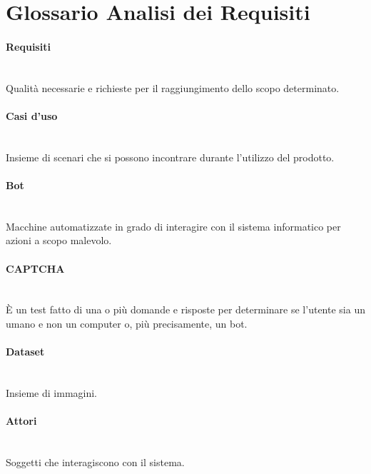 \section{Glossario Analisi dei Requisiti}

\paragraph{Requisiti}~\smallskip \\
Qualità necessarie e richieste per il raggiungimento dello scopo determinato.

\paragraph{Casi d'uso}~\smallskip \\
Insieme di scenari che si possono incontrare durante l'utilizzo del prodotto.

\paragraph{Bot}~\smallskip \\
Macchine automatizzate in grado di interagire con il sistema informatico per azioni a scopo malevolo.

\paragraph{CAPTCHA}~\smallskip \\
È un test fatto di una o più domande e risposte per determinare se l'utente sia un umano e non un computer o, più precisamente, un bot.

\paragraph{Dataset}~\smallskip \\
Insieme di immagini.

\paragraph{Attori}~\smallskip \\
Soggetti che interagiscono con il sistema.

